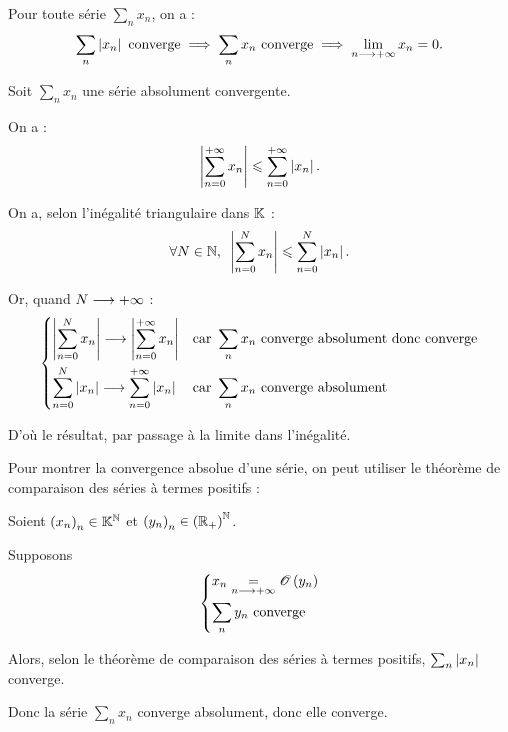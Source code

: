 \begin{bilan}
Pour toute série \(\sum_nx_n\), on a : \[\sum_n\left\lvert x_n\right\rvert\text{ converge}\implies\sum_nx_n\text{ converge}\implies\lim_{n\longrightarrow+\infty}x_n=0.\]
\end{bilan}

\begin{rem}
Soit \(\sum_nx_n\) une série absolument convergente.

On a : \[\left\lvert\sum_{n=0}^{+\infty}x_n\right\rvert\leqslant\sum_{n=0}^{+\infty}\left\lvert x_n\right\rvert.\]
\end{rem}

\begin{dem}
On a, selon l'inégalité triangulaire dans \(\mathbb{K}\) : \[\quantifs{\forall N\in\N}\abs{\sum_{n=0}^Nx_n}\leq\sum_{n=0}^N\abs{x_n}.\]

Or, quand \(N\longrightarrow+\infty\) : \[\begin{dcases}
\left\lvert\sum_{n=0}^Nx_n\right\rvert\longrightarrow\left\lvert\sum_{n=0}^{+\infty}x_n\right\rvert &\text{car }\sum_nx_n\text{ converge absolument donc converge} \\
\sum_{n=0}^N\left\lvert x_n\right\rvert\longrightarrow\sum_{n=0}^{+\infty}\left\lvert x_n\right\rvert &\text{car }\sum_nx_n\text{ converge absolument}
\end{dcases}\]

D'où le résultat, par passage à la limite dans l'inégalité.
\end{dem}

\begin{rem}
Pour montrer la convergence absolue d'une série, on peut utiliser le théorème de comparaison des séries à termes positifs :
\end{rem}

\begin{rem}
Soient \(\left(x_n\right)_n\in\mathbb{K}^{\mathbb{N}}\) et \(\left(y_n\right)_n\in\left(\mathbb{R}_+\right)^{\mathbb{N}}\).

Supposons \[\begin{dcases}
x_n\underset{n\longrightarrow+\infty}{=}\mathscr{O}\left(y_n\right) \\
\sum_ny_n\text{ converge}
\end{dcases}\]

Alors, selon le théorème de comparaison des séries à termes positifs, \(\sum_n\left\lvert x_n\right\rvert\) converge.

Donc la série \(\sum_nx_n\) converge absolument, donc elle converge.
\end{rem}

